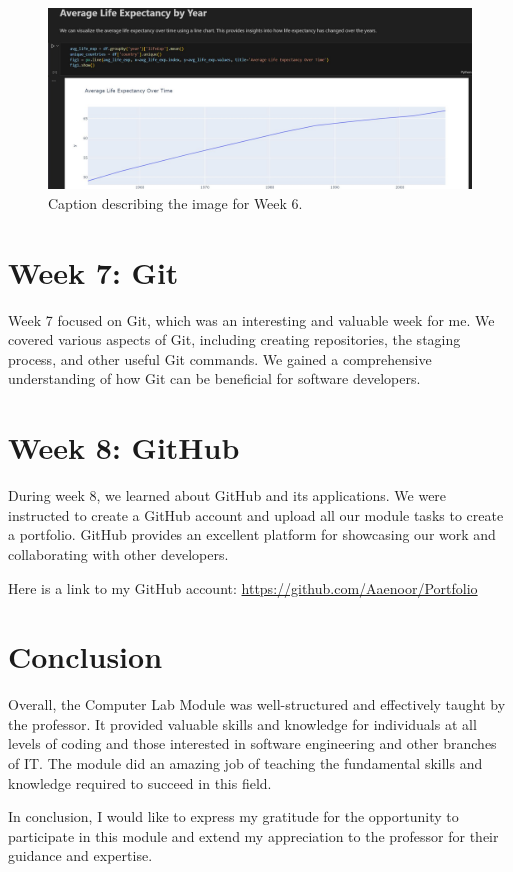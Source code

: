 \documentclass{article}
\begin{document}
\begin{figure}[ht]
  \centering
  \begin{minipage}{0.45\textwidth}
    \centering
    \includegraphics[width=\textwidth]{JH Pt3}
    \caption{Caption describing the image for Week 6.}
    \label{fig:week6_image}
  \end{minipage}
\end{figure}

\section{Week 7: Git}
Week 7 focused on Git, which was an interesting and valuable week for me. We covered various aspects of Git, including creating repositories, the staging process, and other useful Git commands. We gained a comprehensive understanding of how Git can be beneficial for software developers.



\section{Week 8: GitHub}
During week 8, we learned about GitHub and its applications. We were instructed to create a GitHub account and upload all our module tasks to create a portfolio. GitHub provides an excellent platform for showcasing our work and collaborating with other developers.

Here is a link to my GitHub account: \url{https://github.com/Aaenoor/Portfolio}

\section{Conclusion}
Overall, the Computer Lab Module was well-structured and effectively taught by the professor. It provided valuable skills and knowledge for individuals at all levels of coding and those interested in software engineering and other branches of IT. The module did an amazing job of teaching the fundamental skills and knowledge required to succeed in this field.

In conclusion, I would like to express my gratitude for the opportunity to participate in this module and extend my appreciation to the professor for their guidance and expertise.
\end{document}
